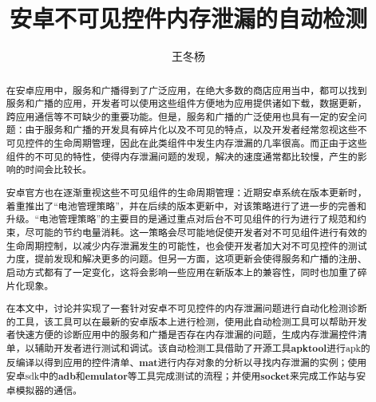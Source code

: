 \documentclass[winfonts]{njuthesis}
\title{安卓不可见控件内存泄漏的自动检测}
\author{王冬杨}
\begin{document}
\maketitle

\begin{abstract}

在安卓应用中，服务和广播得到了广泛应用，在绝大多数的商店应用当中，都可以找到服务和广播的应用，开发者可以使用这些组件方便地为应用提供诸如下载，数据更新，跨应用通信等不可缺少的重要功能。但是，服务和广播的广泛使用也具有一定的安全问题：由于服务和广播的开发具有碎片化以及不可见的特点，以及开发者经常忽视这些不可见控件的生命周期管理，因此在此类组件中发生内存泄漏的几率很高。而正由于这些组件的不可见的特性，使得内存泄漏问题的发现，解决的速度通常都比较慢，产生的影响的时间会比较长。

安卓官方也在逐渐重视这些不可见组件的生命周期管理：近期安卓系统在版本更新时，着重推出了“电池管理策略”，并在后续的版本更新中，对该策略进行了进一步的完善和升级。“电池管理策略”的主要目的是通过重点对后台不可见组件的行为进行了规范和约束，尽可能的节约电量消耗。这一策略会尽可能地促使开发者对不可见组件进行有效的生命周期控制，以减少内存泄漏发生的可能性，也会使开发者加大对不可见控件的测试力度，提前发现和解决更多的问题。但另一方面，这项更新会使得服务和广播的注册、启动方式都有了一定变化，这将会影响一些应用在新版本上的兼容性，同时也加重了碎片化现象。

在本文中，讨论并实现了一套针对安卓不可见控件的内存泄漏问题进行自动化检测诊断的工具，该工具可以在最新的安卓版本上进行检测，使用此自动检测工具可以帮助开发者快速方便的诊断应用中的服务和广播是否存在内存泄漏的问题，生成内存泄漏控件清单，以辅助开发者进行测试和调试。该自动检测工具借助了开源工具\textbf{apktool}\cite{apktool}进行apk的反编译以得到应用的控件清单、\textbf{mat}\cite{mat}进行内存对象的分析以寻找内存泄漏的实例；使用安卓sdk中的\textbf{adb}和\textbf{emulator}等工具完成测试的流程；并使用\textbf{socket}来完成工作站与安卓模拟器的通信。

\end{abstract}

\end{document}
